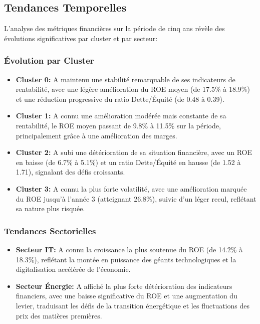 \documentclass[12pt]{article}
\begin{document}
\subsection{Tendances Temporelles}
L'analyse des métriques financières sur la période de cinq ans révèle des évolutions significatives par cluster et par secteur:

\subsubsection{Évolution par Cluster}
\begin{itemize}
    \item \textbf{Cluster 0:} A maintenu une stabilité remarquable de ses indicateurs de rentabilité, avec une légère amélioration du ROE moyen (de 17.5\% à 18.9\%) et une réduction progressive du ratio Dette/Équité (de 0.48 à 0.39).
    
    \item \textbf{Cluster 1:} A connu une amélioration modérée mais constante de sa rentabilité, le ROE moyen passant de 9.8\% à 11.5\% sur la période, principalement grâce à une amélioration des marges.
    
    \item \textbf{Cluster 2:} A subi une détérioration de sa situation financière, avec un ROE en baisse (de 6.7\% à 5.1\%) et un ratio Dette/Équité en hausse (de 1.52 à 1.71), signalant des défis croissants.
    
    \item \textbf{Cluster 3:} A connu la plus forte volatilité, avec une amélioration marquée du ROE jusqu'à l'année 3 (atteignant 26.8\%), suivie d'un léger recul, reflétant sa nature plus risquée.
\end{itemize}

\subsubsection{Tendances Sectorielles}
\begin{itemize}
    \item \textbf{Secteur IT:} A connu la croissance la plus soutenue du ROE (de 14.2\% à 18.3\%), reflétant la montée en puissance des géants technologiques et la digitalisation accélérée de l'économie.
    
    \item \textbf{Secteur Énergie:} A affiché la plus forte détérioration des indicateurs financiers, avec une baisse significative du ROE et une augmentation du levier, traduisant les défis de la transition énergétique et les fluctuations des prix des matières premières.
\end{itemize}
\end{document}
